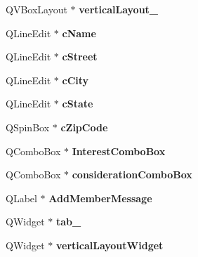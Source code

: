 \begin{DoxyCompactItemize}
\mbox{\label{class_ui___main_window_a6f40fc110b15410c00837a446d57bdbe}} 
Q\+V\+Box\+Layout $\ast$ {\bfseries vertical\+Layout\+\_}
\item 
\mbox{\label{class_ui___main_window_a47f06bbf333c53711ae19082ead81e57}} 
Q\+Line\+Edit $\ast$ {\bfseries c\+Name}
\item 
\mbox{\label{class_ui___main_window_a7e1c5d56e742785f9be25030c0576c74}} 
Q\+Line\+Edit $\ast$ {\bfseries c\+Street}
\item 
\mbox{\label{class_ui___main_window_ac252ddd320023069ce6c95fc9f96917d}} 
Q\+Line\+Edit $\ast$ {\bfseries c\+City}
\item 
\mbox{\label{class_ui___main_window_a07bc1eb21b58683a9aaec0c39688dda6}} 
Q\+Line\+Edit $\ast$ {\bfseries c\+State}
\item 
\mbox{\label{class_ui___main_window_a59bb35c1207ffa1e04e04ed76a49b676}} 
Q\+Spin\+Box $\ast$ {\bfseries c\+Zip\+Code}
\item 
\mbox{\label{class_ui___main_window_a25248d3ec91aa4dd92dfb92ee8ccaf32}} 
Q\+Combo\+Box $\ast$ {\bfseries Interest\+Combo\+Box}
\item 
\mbox{\label{class_ui___main_window_ad19f5985b234e4129634aee2966972b6}} 
Q\+Combo\+Box $\ast$ {\bfseries consideration\+Combo\+Box}
\item 
\mbox{\label{class_ui___main_window_a1182872adcdb1424c893a8f201eabee4}} 
Q\+Label $\ast$ {\bfseries Add\+Member\+Message}
\item 
\mbox{\label{class_ui___main_window_a83495b23cbc6810f81978dc0d584b810}} 
Q\+Widget $\ast$ {\bfseries tab\+\_}
\item 
\mbox{\label{class_ui___main_window_a805d415fff07a22a85219e1f22f2da28}} 
Q\+Widget $\ast$ {\bfseries vertical\+Layout\+Widget}
\item 

\end{DoxyCompactItemize}
